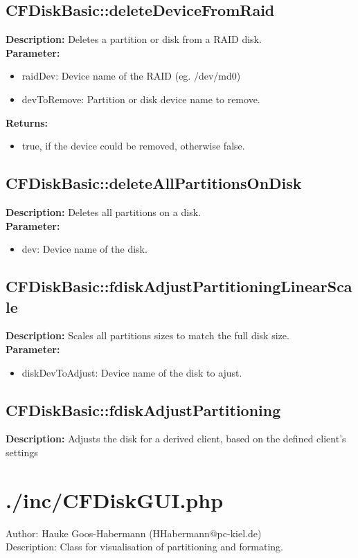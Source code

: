 \subsection{CFDiskBasic::deleteDeviceFromRaid}
\textbf{Description:} Deletes a partition or disk from a RAID disk.\\
\textbf{Parameter:}
\begin{itemize}
\item raidDev: Device name of the RAID (eg. /dev/md0)
\item devToRemove: Partition or disk device name to remove.
\end{itemize}
\textbf{Returns:}
\begin{itemize}
\item true, if the device could be removed, otherwise false.
\end{itemize}

\subsection{CFDiskBasic::deleteAllPartitionsOnDisk}
\textbf{Description:} Deletes all partitions on a disk.\\
\textbf{Parameter:}
\begin{itemize}
\item dev: Device name of the disk.
\end{itemize}

\subsection{CFDiskBasic::fdiskAdjustPartitioningLinearScale}
\textbf{Description:} Scales all partitions sizes to match the full disk size.\\
\textbf{Parameter:}
\begin{itemize}
\item diskDevToAdjust: Device name of the disk to ajust.
\end{itemize}

\subsection{CFDiskBasic::fdiskAdjustPartitioning}
\textbf{Description:} Adjusts the disk for a derived client, based on the defined client's settings\\

\newpage\section{./inc/CFDiskGUI.php}
 Author: Hauke Goos-Habermann (HHabermann@pc-kiel.de)\\
 Description: Class for visualisation of partitioning and formating.\\

